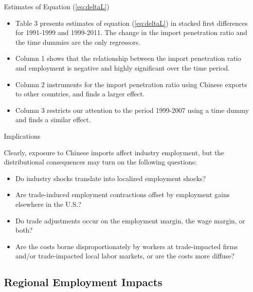 \documentclass[aspectratio=169]{beamer}
\begin{document}
\begin{frame}{Estimates of Equation (\ref{eq:deltaL})}

\begin{itemize}
    \item<1-> Table 3 presents estimates of equation (\ref{eq:deltaL}) in stacked first differences for 1991-1999 and 1999-2011.  The change in the import penetration ratio and the time dummies are the only regressors.
    \item<2-> Column 1 shows that the relationship between the import penetration ratio and employment is negative and highly significant over the time period.
    \item<3-> Column 2 instruments for the import penetration ratio using Chinese exports to other countries, and finds a larger effect.
    \item<3-> Column 3 restricts our attention to the period 1999-2007 using a time dummy and finds a similar effect.
\end{itemize}
    
\end{frame}


\begin{frame}{Implications}

Clearly, exposure to Chinese imports affect industry employment, but the distributional consequences may turn on the following questions:
\begin{itemize}
    \item<1-> Do industry shocks translate into localized employment shocks?
    \item<2-> Are trade-induced employment contractions offset by employment gains elsewhere in the U.S.?
    \item<3-> Do trade adjustments occur on the employment margin, the wage margin, or both?
    \item<4-> Are the costs borne disproportionately by workers at trade-impacted firms and/or trade-impacted local labor markets, or are the costs more diffuse?
\end{itemize}
    
\end{frame}


\subsection{Regional Employment Impacts}
\end{document}
